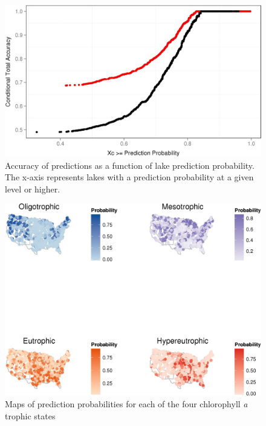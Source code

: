 \documentclass[12pt,]{article}
\begin{document}
\newpage

\begin{figure}[htbp]
\centering
\includegraphics{manuscript_files/figure-latex/cond_prob_fig-1.jpeg}
\caption{Accuracy of predictions as a function of lake prediction
probability. The x-axis represents lakes with a prediction probability
at a given level or higher. \label{fig:cond_prob_fig}}
\end{figure}

\newpage

\begin{figure}[htbp]
\centering
\includegraphics{manuscript_files/figure-latex/gis_probability_map-1.jpeg}
\caption{Maps of prediction probabilities for each of the four
chlorophyll \textit{a} trophic states \label{fig:gis_probability_map}}
\end{figure}

\newpage
\end{document}
